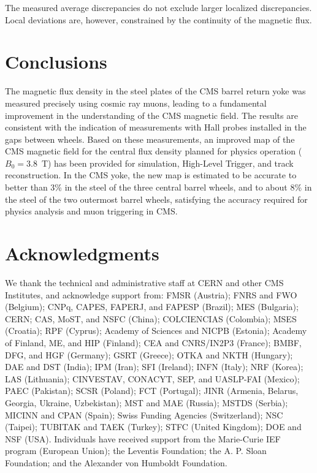 The measured average discrepancies do not
exclude larger localized discrepancies. Local deviations are, however,
constrained by the continuity of the magnetic flux.


\section{Conclusions}
\label{sec:conclusions}
The magnetic flux density in the steel plates of the CMS barrel return yoke was measured
precisely using cosmic ray muons, leading to a fundamental improvement
in the understanding of the CMS magnetic field.
The results are consistent with the indication of
measurements with Hall probes installed in the gaps between wheels.
Based on these measurements, an
improved map of the CMS magnetic field for the central flux
density planned for physics operation ($B_0=3.8$~T)
has been provided for simulation,
High-Level Trigger, and track reconstruction.
In the CMS yoke, the new map is estimated to be accurate to better
than 3\% in the steel of the three central barrel wheels, and to
about 8\% in the steel of the two outermost barrel wheels, satisfying the accuracy
required for physics analysis and muon triggering in CMS.

\section*{Acknowledgments}
We thank the technical and administrative staff at CERN and other CMS
Institutes, and acknowledge support from: FMSR (Austria); FNRS and FWO
(Belgium); CNPq, CAPES, FAPERJ, and FAPESP (Brazil); MES (Bulgaria);
CERN; CAS, MoST, and NSFC (China); COLCIENCIAS (Colombia); MSES
(Croatia); RPF (Cyprus); Academy of Sciences and NICPB (Estonia);
Academy of Finland, ME, and HIP (Finland); CEA and CNRS/IN2P3
(France); BMBF, DFG, and HGF (Germany); GSRT (Greece); OTKA and NKTH
(Hungary); DAE and DST (India); IPM (Iran); SFI (Ireland); INFN
(Italy); NRF (Korea); LAS (Lithuania); CINVESTAV, CONACYT, SEP, and
UASLP-FAI (Mexico); PAEC (Pakistan); SCSR (Poland); FCT (Portugal);
JINR (Armenia, Belarus, Georgia, Ukraine, Uzbekistan); MST and MAE
(Russia); MSTDS (Serbia); MICINN and CPAN (Spain); Swiss Funding
Agencies (Switzerland); NSC (Taipei); TUBITAK and TAEK (Turkey); STFC
(United Kingdom); DOE and NSF (USA). Individuals have received support
from the Marie-Curie IEF program (European Union); the Leventis
Foundation; the A. P. Sloan Foundation; and the Alexander von Humboldt
Foundation.




